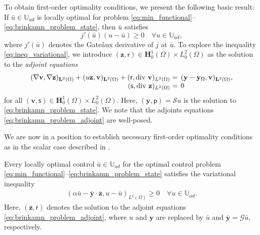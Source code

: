 \documentclass[final]{siamart0216}
\begin{document}
To obtain first-order optimality conditions, we present the following basic result: If $\bar{u} \in \mathbb{U}_{ad}$ is locally optimal for problem \eqref{eq:min_functional}--\eqref{eq:brinkamn_problem_state}, then $\bar{u}$ satisfies \cite[Lemma 4.18]{MR2583281}
\begin{equation}\label{eq:ineq_variational}
j'(\bar{u})(u-\bar{u})\geq 0\quad \forall u\in \mathbb{U}_{ad},
\end{equation}
where $j'(\bar{u})$ denotes the Gate\^aux derivative of $j$ at $\bar{u}$. To explore the inequality \eqref{eq:ineq_variational}, we introduce $(\mathbf{z},\mathsf{r})\in\mathbf{H}_0^1(\Omega)\times L_0^2(\Omega)$ as the solution to the \emph{adjoint equations}
\begin{equation}\label{eq:brinkamn_problem_adjoint}
\begin{array}{rl}
(\nabla \mathbf{v}, \nabla \mathbf{z})_{\mathbf{L}^2(\Omega)}
+
( u\mathbf{z}, \mathbf{v})_{\mathbf{L}^2(\Omega)}
+
(\mathsf{r},\text{div }\mathbf{v})_{L^2(\Omega)} = &\hspace{-2mm} (\mathbf{y}-\mathbf{y}_{\Omega},\mathbf{v})_{\mathbf{L}^2(\Omega)},
\\
(\mathsf{s},\text{div }\mathbf{z})_{L^2(\Omega)}  = & \hspace{-2mm} 0
\end{array}
\end{equation}
for all $(\mathbf{v},\mathsf{s}) \in \mathbf{H}_0^1(\Omega) \times L_0^2(\Omega)$. Here, $(\mathbf{y},\mathsf{p})=\mathcal{S}u$ is the solution to \eqref{eq:brinkamn_problem_state}. We note that the adjoints equations \eqref{eq:brinkamn_problem_adjoint} are well-posed.

We are now in a position to establish necessary first-order optimality conditions as in the scalar case described in \cite[identity (2.6)]{MR2536007}.

\begin{theorem}
Every locally optimal control $\bar{u}\in \mathbb{U}_{ad}$ for the optimal control problem \eqref{eq:min_functional}--\eqref{eq:brinkamn_problem_state} satisfies the variational inequality
\begin{eqnarray}\label{eq:variational_inequality}
(\alpha \bar{u}-\bar{\mathbf{y}}\cdot \bar{\mathbf{z}},u-\bar{u})_{L^2(\Omega)}\geq 0\quad \forall u\in \mathbb{U}_{ad}.
\end{eqnarray}
Here, $(\bar{\mathbf{z}},\bar{\mathsf{r}})$ denotes the solution to the adjoint equations \eqref{eq:brinkamn_problem_adjoint}, where $u$ and $\mathbf{y}$ are replaced by $\bar{u}$ and $\bar{\mathbf{y}}=\mathcal{G}\bar{u}$, respectively.
\end{theorem}
\end{document}
